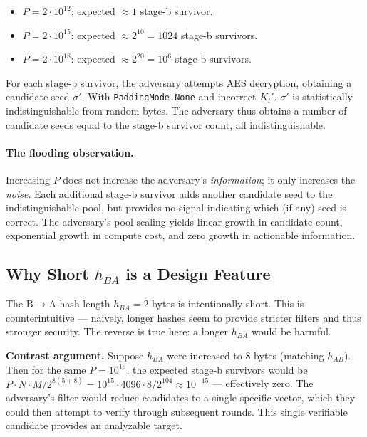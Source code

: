 \documentclass[11pt,a4paper]{article}
\begin{document}
\begin{itemize}[leftmargin=*]
\item $P = 2 \cdot 10^{12}$: expected $\approx 1$ stage-b survivor.
\item $P = 2 \cdot 10^{15}$: expected $\approx 2^{10} = 1024$ stage-b survivors.
\item $P = 2 \cdot 10^{18}$: expected $\approx 2^{20} = 10^{6}$ stage-b survivors.
\end{itemize}

For each stage-b survivor, the adversary attempts AES decryption, obtaining a candidate seed $\sigma'$. With \texttt{PaddingMode.None} and incorrect $K_t'$, $\sigma'$ is statistically indistinguishable from random bytes. The adversary thus obtains a number of candidate seeds equal to the stage-b survivor count, all indistinguishable.

\paragraph{The flooding observation.} Increasing $P$ does not increase the adversary's \emph{information}; it only increases the \emph{noise}. Each additional stage-b survivor adds another candidate seed to the indistinguishable pool, but provides no signal indicating which (if any) seed is correct. The adversary's pool scaling yields linear growth in candidate count, exponential growth in compute cost, and zero growth in actionable information.

\subsection{Why Short $h_{BA}$ is a Design Feature}

The B$\to$A hash length $h_{BA} = 2$ bytes is intentionally short. This is counterintuitive --- naively, longer hashes seem to provide stricter filters and thus stronger security. The reverse is true here: a longer $h_{BA}$ would be harmful.

\textbf{Contrast argument.} Suppose $h_{BA}$ were increased to $8$ bytes (matching $h_{AB}$). Then for the same $P = 10^{15}$, the expected stage-b survivors would be $P \cdot N \cdot M / 2^{8(5+8)} = 10^{15} \cdot 4096 \cdot 8 / 2^{104} \approx 10^{-15}$ --- effectively zero. The adversary's filter would reduce candidates to a single specific vector, which they could then attempt to verify through subsequent rounds. This single verifiable candidate provides an analyzable target.
\end{document}
